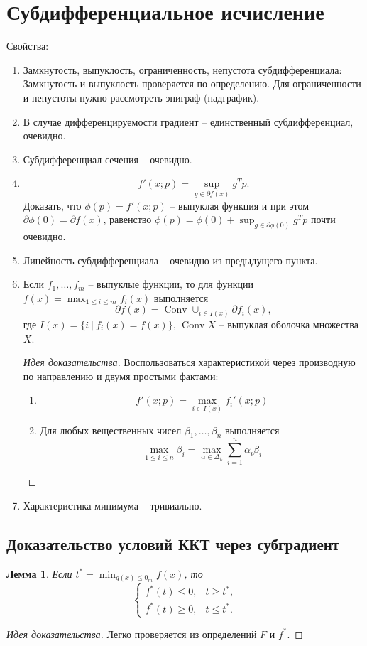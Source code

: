 \documentclass[10pt,a4paper]{article}
\newtheorem{lemma_ru}{Лемма}[section]
\newenvironment{sketch}
    {\begin{proof}[Идея доказательства]
    }
    { 
    \end{proof}
    }
\DeclareMathOperator{\conv}{Conv}
\begin{document}
\section{Субдифференциальное исчисление}
Свойства:
\begin{enumerate}
\item Замкнутость, выпуклость, ограниченность, непустота субдифференциала:\\
Замкнутость и выпуклость проверяется по определению. Для ограниченности и непустоты нужно рассмотреть эпиграф (надграфик).
\item В случае дифференцируемости градиент -- единственный субдифференциал, очевидно.
\item Субдифференциал сечения -- очевидно.
\item 
$$
f'(x;p)=\sup_{g\in \partial f(x)}g^Tp.
$$
Доказать, что $\phi(p)=f'(x;p)$ -- выпуклая функция и при этом $\partial \phi(0)=\partial f(x)$, равенство $\phi(p)=\phi(0)+\sup_{g\in\partial \phi(0)}g^Tp$ почти очевидно.
\item Линейность субдифференциала -- очевидно из предыдущего пункта.
\item Если $f_1, \ldots, f_m$ -- выпуклые функции, то для функции $f(x)=\max_{1\leq i\leq m}f_i(x)$ выполняется
$$
\partial f(x)=\conv\cup_{i\in I(x)}\partial f_i(x),
$$
где $I(x)=\{i~|~f_i(x)=f(x)\}$, $\conv X$ -- выпуклая оболочка множества $X$.\\
\begin{sketch}
Воспользоваться характеристикой через производную по направлению и двумя простыми фактами:
\begin{enumerate}
\item 
$$
f'(x;p)=\max_{i\in I(x)}f_i'(x;p)
$$
\item Для любых вещественных чисел $\beta_1, \ldots, \beta_n$ выполняется
$$
\max_{1\leq i\leq n}\beta_i=\max_{\alpha\in\Delta_k}\sum_{i=1}^n\alpha_i\beta_i
$$
\end{enumerate}
\end{sketch} 
\item Характеристика минимума -- тривиально.
\end{enumerate}

\subsection{Доказательство условий ККТ через субградиент}
\begin{lemma_ru}
Если $t^*=\min_{g(x)\leq 0_m}f(x)$, то
$$
\begin{cases}
f^*(t)\leq 0, & t\geq t^*,\\
f^*(t)\geq 0, & t\leq t^*.
\end{cases}
$$
\end{lemma_ru}
\begin{sketch}
Легко проверяется из определений $F$ и $f^*$.
\end{sketch}
\end{document}
